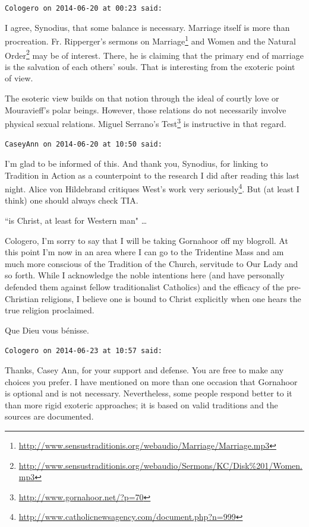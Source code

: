 \begin{footnotesize}
\begin{sffamily}
\hfill

\texttt{Cologero on 2014-06-20 at 00:23 said: }

I agree, Synodius, that some balance is necessary. Marriage itself is more than procreation. Fr. Ripperger's sermons on Marriage\footnote{\url{http://www.sensustraditionis.org/webaudio/Marriage/Marriage.mp3}} and Women and the Natural Order\footnote{\url{http://www.sensustraditionis.org/webaudio/Sermons/KC/Disk\%201/Women.mp3}} may be of interest. There, he is claiming that the primary end of marriage is the salvation of each others' souls. That is interesting from the exoteric point of view.

The esoteric view builds on that notion through the ideal of courtly love or Mouravieff's polar beings. However, those relations do not necessarily involve physical sexual relations. Miguel Serrano's Test\footnote{\url{http://www.gornahoor.net/?p=70}} is instructive in that regard.


\hfill

\texttt{CaseyAnn on 2014-06-20 at 10:50 said: }

I'm glad to be informed of this. And thank you, Synodius, for linking to Tradition in Action as a counterpoint to the research I did after reading this last night. Alice von Hildebrand critiques West's work very seriously\footnote{\url{http://www.catholicnewsagency.com/document.php?n=999}}. But (at least I think) one should always check TIA. 

``is Christ, at least for Western man" …

Cologero, I'm sorry to say that I will be taking Gornahoor off my blogroll. At this point I'm now in an area where I can go to the Tridentine Mass and am much more conscious of the Tradition of the Church, servitude to Our Lady and so forth. While I acknowledge the noble intentions here (and have personally defended them against fellow traditionalist Catholics) and the efficacy of the pre-Christian religions, I believe one is bound to Christ explicitly when one hears the true religion proclaimed. 

Que Dieu vous bénisse.


\hfill

\texttt{Cologero on 2014-06-23 at 10:57 said: }

Thanks, Casey Ann, for your support and defense. You are free to make any choices you prefer. I have mentioned on more than one occasion that Gornahoor is optional and is not necessary. Nevertheless, some people respond better to it than more rigid exoteric approaches; it is based on valid traditions and the sources are documented.


\end{sffamily}
\end{footnotesize}
